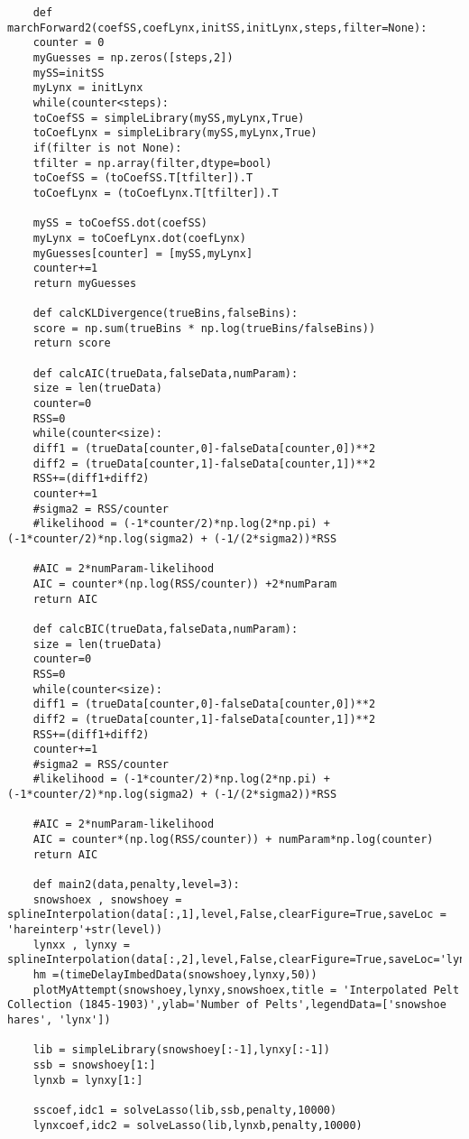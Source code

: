 \documentclass[12pt]{article}
\begin{document}
\begin{verbatim}
	def marchForward2(coefSS,coefLynx,initSS,initLynx,steps,filter=None):
	counter = 0
	myGuesses = np.zeros([steps,2])
	mySS=initSS
	myLynx = initLynx
	while(counter<steps):
	toCoefSS = simpleLibrary(mySS,myLynx,True)
	toCoefLynx = simpleLibrary(mySS,myLynx,True)
	if(filter is not None):
	tfilter = np.array(filter,dtype=bool)
	toCoefSS = (toCoefSS.T[tfilter]).T
	toCoefLynx = (toCoefLynx.T[tfilter]).T
	
	mySS = toCoefSS.dot(coefSS)
	myLynx = toCoefLynx.dot(coefLynx)
	myGuesses[counter] = [mySS,myLynx]
	counter+=1
	return myGuesses
	
	def calcKLDivergence(trueBins,falseBins):
	score = np.sum(trueBins * np.log(trueBins/falseBins))
	return score
	
	def calcAIC(trueData,falseData,numParam):
	size = len(trueData)
	counter=0
	RSS=0
	while(counter<size):
	diff1 = (trueData[counter,0]-falseData[counter,0])**2
	diff2 = (trueData[counter,1]-falseData[counter,1])**2
	RSS+=(diff1+diff2)
	counter+=1
	#sigma2 = RSS/counter
	#likelihood = (-1*counter/2)*np.log(2*np.pi) + (-1*counter/2)*np.log(sigma2) + (-1/(2*sigma2))*RSS
	
	#AIC = 2*numParam-likelihood
	AIC = counter*(np.log(RSS/counter)) +2*numParam
	return AIC
	
	def calcBIC(trueData,falseData,numParam):
	size = len(trueData)
	counter=0
	RSS=0
	while(counter<size):
	diff1 = (trueData[counter,0]-falseData[counter,0])**2
	diff2 = (trueData[counter,1]-falseData[counter,1])**2
	RSS+=(diff1+diff2)
	counter+=1
	#sigma2 = RSS/counter
	#likelihood = (-1*counter/2)*np.log(2*np.pi) + (-1*counter/2)*np.log(sigma2) + (-1/(2*sigma2))*RSS
	
	#AIC = 2*numParam-likelihood
	AIC = counter*(np.log(RSS/counter)) + numParam*np.log(counter)
	return AIC
	
	def main2(data,penalty,level=3):
	snowshoex , snowshoey = splineInterpolation(data[:,1],level,False,clearFigure=True,saveLoc = 'hareinterp'+str(level))
	lynxx , lynxy = splineInterpolation(data[:,2],level,False,clearFigure=True,saveLoc='lynxinterp'+str(level))
	hm =(timeDelayImbedData(snowshoey,lynxy,50))
	plotMyAttempt(snowshoey,lynxy,snowshoex,title = 'Interpolated Pelt Collection (1845-1903)',ylab='Number of Pelts',legendData=['snowshoe hares', 'lynx'])
	
	lib = simpleLibrary(snowshoey[:-1],lynxy[:-1])
	ssb = snowshoey[1:]
	lynxb = lynxy[1:]
	
	sscoef,idc1 = solveLasso(lib,ssb,penalty,10000)
	lynxcoef,idc2 = solveLasso(lib,lynxb,penalty,10000)
	

\end{verbatim}
\end{document}
